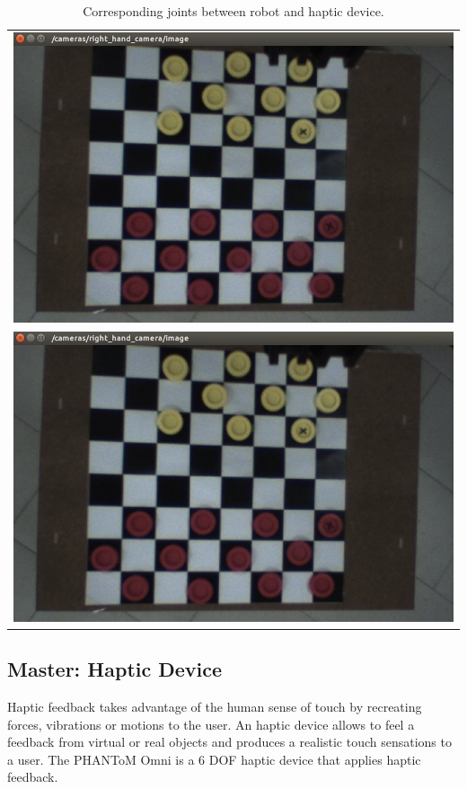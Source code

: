 \documentclass[journal,twoside]{JoPhA}
\begin{document}
\begin{table}
\centering
\begin{tabular}{c}
\includegraphics[scale=0.25]{Images/baxterCamaraBrazo.jpg} \\
\includegraphics[scale=0.25]{Images/baxterCamaraBrazo.jpg} 
\end{tabular}
\caption{\label{tabla_joints} Corresponding joints between robot and haptic device.}
\end{table}



\subsection{Master: Haptic Device}
Haptic feedback takes advantage of the human sense of touch by recreating forces, vibrations or motions to the user. 
An haptic device allows to feel a feedback from virtual or real objects and produces a realistic touch sensations to a user. 
The PHANToM Omni is a 6 DOF haptic device that applies haptic feedback. 
\end{document}
